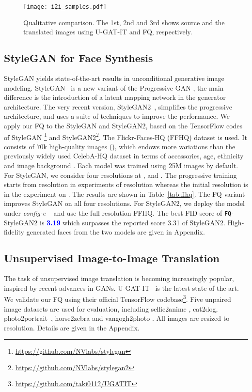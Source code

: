 \documentclass{article}
\begin{document}
\begin{figure*}[!t]
    \centering
    \texttt{[image: i2i\_samples.pdf]}
\caption{Qualitative comparison. The 1st, 2nd and 3rd shows source and the translated images using U-GAT-IT and FQ, respectively. }
    \label{fig:i2i_samples}
\end{figure*}


\subsection{StyleGAN for Face Synthesis}
StyleGAN yields state-of-the-art results in unconditional generative image modeling. 
StyleGAN~\citep{karras2019style} is a new variant of the Progressive GAN \citep{karras2018progressive}, the main difference is the introduction of a latent mapping network in the generator architecture. 
The very recent version, StyleGAN2~\cite{karras2019analyzing}, simplifies the progressive architecture, and uses a suite of techniques to improve the performance.
We apply our FQ to the StyleGAN and StyleGAN2, based on the TensorFlow codes of StyleGAN \footnote{\scriptsize \url{https://github.com/NVlabs/stylegan}}
and StyleGAN2\footnote{\scriptsize \url{https://github.com/NVlabs/stylegan2}}. 
The Flickr-Faces-HQ (FFHQ) dataset \citep{karras2019style} is used. It consists of 70k high-quality images (), which endows more variations than the previously widely used CelebA-HQ dataset in terms of accessories, age, ethnicity and image background  \citep{karras2019style}. Each model was trained using 25M images by default.
For StyleGAN, we consider four resolutions at ,  and . The progressive training starts from resolution  in experiments of resolution  whereas the initial resolution is  in the experiment on . The results are shown in Table~\ref{tab:ffhq}. The FQ variant improves StyleGAN on all four resolutions. For StyleGAN2, we deploy the model under \textit{config-e} ~\cite{karras2019analyzing} and use the full resolution FFHQ. The best FID score of \textbf{\texttt{FQ}}-StyleGAN2 is \textcolor{blue}{{\bf 3.19}} which surpasses the reported score 3.31 of StyleGAN2. High-fidelity generated faces from the two models are given in Appendix.

\subsection{Unsupervised Image-to-Image Translation}
The task of unsupervised image translation is becoming increasingly popular, inspired by recent advances in GANs. U-GAT-IT~\cite{kim2019u} is the latest state-of-the-art. 
We validate our FQ using their official TensorFlow codebase\footnote{\scriptsize \url{https://github.com/taki0112/UGATIT}}. 
Five unpaired image datasets are used for evaluation, including selfie2anime \citep{kim2019u}, cat2dog, photo2portrait~\citep{lee2018diverse}, horse2zebra and vangogh2photo \citep{zhu2017unpaired}.  
All images are resized to  resolution. Details are given in the Appendix.
\end{document}
